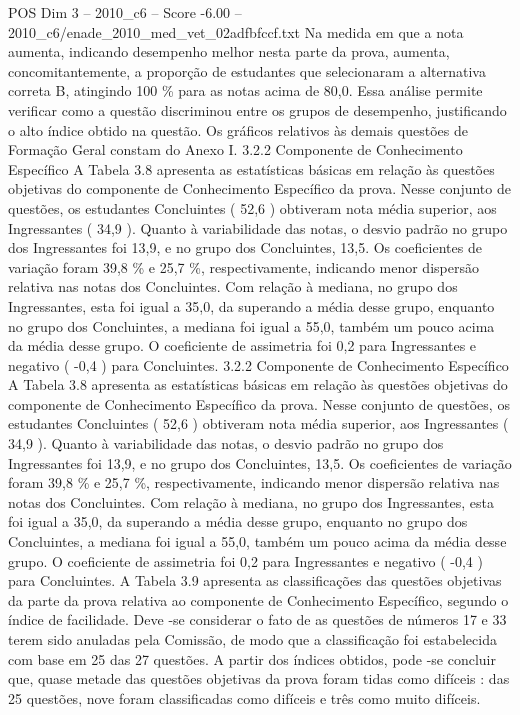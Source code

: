 \begin{textsample}{POS Dim 3 – 2010\_c6 – Score -6.00 – 2010\_c6/enade\_2010\_med\_vet\_02adfbfccf.txt}
Na medida em que a nota aumenta, indicando desempenho melhor nesta parte da prova, aumenta, concomitantemente, a proporção de estudantes que selecionaram a alternativa correta B, atingindo 100 \% para as notas acima de 80,0.
Essa análise permite verificar como a questão discriminou entre os grupos de desempenho, justificando o alto índice obtido na questão.
Os gráficos relativos às demais questões de Formação Geral constam do Anexo I. 3.2.2 Componente de Conhecimento Específico A Tabela 3.8 apresenta as estatísticas básicas em relação às questões objetivas do componente de Conhecimento Específico da prova.
Nesse conjunto de questões, os estudantes Concluintes ( 52,6 ) obtiveram nota média superior, aos Ingressantes ( 34,9 ).
Quanto à variabilidade das notas, o desvio padrão no grupo dos Ingressantes foi 13,9, e no grupo dos Concluintes, 13,5.
Os coeficientes de variação foram 39,8 \% e 25,7 \%, respectivamente, indicando menor dispersão relativa nas notas dos Concluintes.
Com relação à mediana, no grupo dos Ingressantes, esta foi igual a 35,0, da superando a média desse grupo, enquanto no grupo dos Concluintes, a mediana foi igual a 55,0, também um pouco acima da média desse grupo.
O coeficiente de assimetria foi 0,2 para Ingressantes e negativo ( -0,4 ) para Concluintes. 3.2.2 Componente de Conhecimento Específico A Tabela 3.8 apresenta as estatísticas básicas em relação às questões objetivas do componente de Conhecimento Específico da prova.
Nesse conjunto de questões, os estudantes Concluintes ( 52,6 ) obtiveram nota média superior, aos Ingressantes ( 34,9 ).
Quanto à variabilidade das notas, o desvio padrão no grupo dos Ingressantes foi 13,9, e no grupo dos Concluintes, 13,5.
Os coeficientes de variação foram 39,8 \% e 25,7 \%, respectivamente, indicando menor dispersão relativa nas notas dos Concluintes.
Com relação à mediana, no grupo dos Ingressantes, esta foi igual a 35,0, da superando a média desse grupo, enquanto no grupo dos Concluintes, a mediana foi igual a 55,0, também um pouco acima da média desse grupo.
O coeficiente de assimetria foi 0,2 para Ingressantes e negativo ( -0,4 ) para Concluintes.
A Tabela 3.9 apresenta as classificações das questões objetivas da parte da prova relativa ao componente de Conhecimento Específico, segundo o índice de facilidade.
Deve -se considerar o fato de as questões de números 17 e 33 terem sido anuladas pela Comissão, de modo que a classificação foi estabelecida com base em 25 das 27 questões.
A partir dos índices obtidos, pode -se concluir que, quase metade das questões objetivas da prova foram tidas como difíceis : das 25 questões, nove foram classificadas como difíceis e três como muito difíceis.

\end{textsample}
